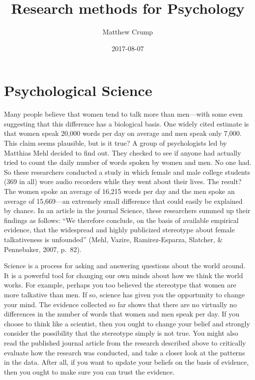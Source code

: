 \documentclass[]{book}
\title{Research methods for Psychology}
\author{Matthew Crump}
\date{2017-08-07}
\theoremstyle{definition}
\theoremstyle{definition}
\theoremstyle{remark}
\begin{document}
\maketitle

{
\setcounter{tocdepth}{1}
\tableofcontents
}
\chapter{Psychological Science}\label{psychological-science}

Many people believe that women tend to talk more than men---with some
even suggesting that this difference has a biological basis. One widely
cited estimate is that women speak 20,000 words per day on average and
men speak only 7,000. This claim seems plausible, but is it true? A
group of psychologists led by Matthias Mehl decided to find out. They
checked to see if anyone had actually tried to count the daily number of
words spoken by women and men. No one had. So these researchers
conducted a study in which female and male college students (369 in all)
wore audio recorders while they went about their lives. The result? The
women spoke an average of 16,215 words per day and the men spoke an
average of 15,669---an extremely small difference that could easily be
explained by chance. In an article in the journal Science, these
researchers summed up their findings as follows: ``We therefore
conclude, on the basis of available empirical evidence, that the
widespread and highly publicized stereotype about female talkativeness
is unfounded'' (Mehl, Vazire, Ramirez-Esparza, Slatcher, \& Pennebaker,
2007, p.~82).

Science is a process for asking and answering questions about the world
around. It is a powerful tool for changing our own minds about how we
think the world works. For example, perhaps you too believed the
stereotype that women are more talkative than men. If so, science has
given you the opportunity to change your mind. The evidence collected so
far shows that there are no virtually no differences in the number of
words that women and men speak per day. If you choose to think like a
scientist, then you ought to change your belief and strongly consider
the possibility that the stereotype simply is not true. You might also
read the published journal article from the research described above to
critically evaluate how the research was conducted, and take a closer
look at the patterns in the data. After all, if you want to update your
beliefs on the basis of evidence, then you ought to make sure you can
trust the evidence.
\end{document}
